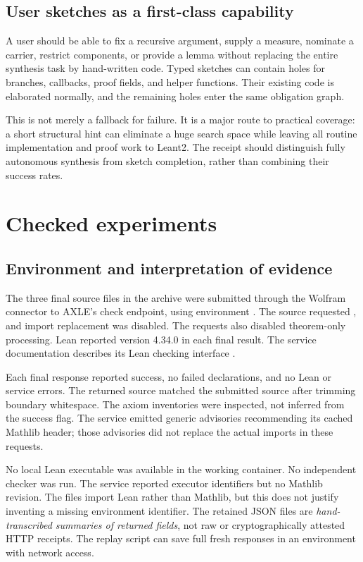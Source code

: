 \documentclass[11pt,letterpaper]{article}
\newcommand{\code}[1]{\texttt{\detokenize{#1}}}
\theoremstyle{definition}
\theoremstyle{remark}
\begin{document}
\subsection{User sketches as a first-class capability}

A user should be able to fix a recursive argument, supply a measure, nominate a carrier, restrict components, or provide a lemma without replacing the entire synthesis task by hand-written code. Typed sketches can contain holes for branches, callbacks, proof fields, and helper functions. Their existing code is elaborated normally, and the remaining holes enter the same obligation graph.

This is not merely a fallback for failure. It is a major route to practical coverage: a short structural hint can eliminate a huge search space while leaving all routine implementation and proof work to Leant2. The receipt should distinguish fully autonomous synthesis from sketch completion, rather than combining their success rates.

\section{Checked experiments}
\label{sec:experiments}

\subsection{Environment and interpretation of evidence}

The three final source files in the archive were submitted through the Wolfram connector to AXLE's check endpoint, using environment \code{lean-4.34.0}. The source requested \code{import Lean}, and import replacement was disabled. The requests also disabled theorem-only processing. Lean reported version 4.34.0 in each final result. The service documentation describes its Lean checking interface \cite{axle}.

Each final response reported success, no failed declarations, and no Lean or service errors. The returned source matched the submitted source after trimming boundary whitespace. The axiom inventories were inspected, not inferred from the success flag. The service emitted generic advisories recommending its cached Mathlib header; those advisories did not replace the actual imports in these requests.

No local Lean executable was available in the working container. No independent checker was run. The service reported executor identifiers but no Mathlib revision. The files import Lean rather than Mathlib, but this does not justify inventing a missing environment identifier. The retained JSON files are \emph{hand-transcribed summaries of returned fields}, not raw or cryptographically attested HTTP receipts. The replay script can save full fresh responses in an environment with network access.
\end{document}
